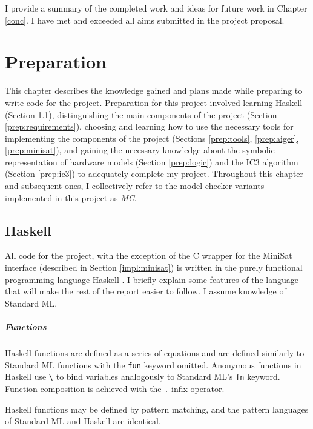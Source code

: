 \documentclass[12pt,a4paper,twoside,openright]{report}
\begin{document}
I provide a summary of the completed work and ideas for
future work in Chapter \ref{conc}. %
I have met and exceeded all aims submitted in the project proposal.

\chapter{Preparation}
\label{prep}

This chapter describes the knowledge gained and plans made while preparing
to write code for the project.
Preparation for this project involved learning
Haskell (Section \ref{prep:haskell}),
distinguishing the main components of the project
(Section \ref{prep:requirements}), choosing and learning how to use
the necessary tools for implementing the components of the project
(Sections \ref{prep:tools}, \ref{prep:aiger}, \ref{prep:minisat}),
and gaining the necessary knowledge about the symbolic representation
of hardware models
(Section \ref{prep:logic}) and the IC3 algorithm (Section \ref{prep:ic3}) to
adequately complete my project.
Throughout this chapter and subsequent ones, I collectively refer to the model checker
variants implemented in this project as \emph{MC}.

\section{Haskell}
\label{prep:haskell}

All code for the project, with the exception of the C wrapper for the
MiniSat interface (described in Section \ref{impl:minisat})
is written in the purely functional
programming language Haskell \cite{haskell}.
I briefly explain some features of the
language that will make the rest of the report easier to follow. I assume
knowledge of Standard ML.

\paragraph{Functions}{
Haskell functions are defined as a series of equations and
are defined similarly to Standard ML functions with the
\verb,fun, keyword omitted. Anonymous functions in Haskell
use \verb,\, to bind variables analogously to Standard
ML's \verb,fn, keyword. Function composition is achieved with the \verb,., infix operator.

Haskell functions may be defined  by pattern matching, and the pattern languages of Standard
ML and Haskell are identical.
}
\end{document}
